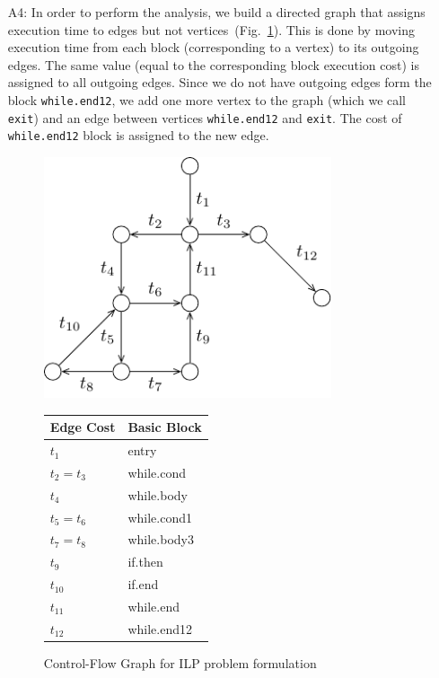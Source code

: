\documentclass[12pt,a4paper,titlepage,oneside]{article}
\begin{document}
\begin{itemize}
\item[A4:] 
In order to perform the analysis, we build a directed graph that assigns execution time to edges but not vertices~(Fig.~\ref{fig:ilp}).
This is done by moving execution time from each block (corresponding to a vertex) to its outgoing edges.
The same value (equal to the corresponding block execution cost) is assigned to all outgoing edges.
Since we do not have outgoing edges form the block \texttt{while.end12}, we add one more vertex to the graph (which we call \texttt{exit}) and an edge between vertices \texttt{while.end12} and \texttt{exit}.
The cost of \texttt{while.end12} block is assigned to the new edge.
\begin{figure}
  \centering
  \begin{minipage}[c]{.6\linewidth}
    \centering
    \includegraphics[width=0.8\textwidth]{graph}
  \end{minipage}%
  \begin{minipage}[c]{.3\linewidth}
    \centering
    \small
	\begin{tabular}{l|l}
		\hline
		Edge Cost & Basic Block \\
		\hline
		$t_1$ & entry \\
		$t_2 = t_3$ & while.cond \\
		$t_4$ & while.body \\
		$t_5 = t_6$ & while.cond1 \\
		$t_7 = t_8$ & while.body3 \\
		$t_9$ & if.then \\
		$t_{10}$ & if.end \\
		$t_{11}$ & while.end \\
		$t_{12}$ & while.end12 \\
		\hline
	\end{tabular}
  \end{minipage}
  \caption{Control-Flow Graph for ILP problem formulation}
  \label{fig:ilp}
\end{figure}


\end{itemize}
\end{document}
